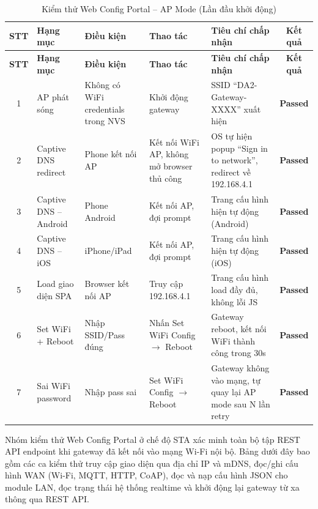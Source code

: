         \begin{longtable}{|c|p{2cm}|p{3cm}|p{3cm}|p{4cm}|c|}
            \caption{Kiểm thử Web Config Portal -- AP Mode (Lần đầu khởi động)}
            \label{tab:test_web_config_ap} \\
            \hline
            \textbf{STT} & \textbf{Hạng mục} & \textbf{Điều kiện} & \textbf{Thao tác} & \textbf{Tiêu chí chấp nhận} & \textbf{Kết quả} \\ \hline
            \endfirsthead
            \hline
            \textbf{STT} & \textbf{Hạng mục} & \textbf{Điều kiện} & \textbf{Thao tác} & \textbf{Tiêu chí chấp nhận} & \textbf{Kết quả} \\ \hline
            \endhead
            \hline
            \endfoot
            \endlastfoot

            1 & AP phát sóng & Không có WiFi credentials trong NVS & Khởi động gateway & SSID ``DA2-Gateway-XXXX'' xuất hiện & \textcolor{modern_blue}{\textbf{Passed}} \\ \hline
            2 & Captive DNS redirect & Phone kết nối AP & Kết nối WiFi AP, không mở browser thủ công & OS tự hiện popup ``Sign in to network'', redirect về 192.168.4.1 & \textcolor{modern_blue}{\textbf{Passed}} \\ \hline
            3 & Captive DNS -- Android & Phone Android & Kết nối AP, đợi prompt & Trang cấu hình hiện tự động (Android) & \textcolor{modern_blue}{\textbf{Passed}} \\ \hline
            4 & Captive DNS -- iOS & iPhone/iPad & Kết nối AP, đợi prompt & Trang cấu hình hiện tự động (iOS) & \textcolor{modern_blue}{\textbf{Passed}} \\ \hline
            5 & Load giao diện SPA & Browser kết nối AP & Truy cập 192.168.4.1 & Trang cấu hình load đầy đủ, không lỗi JS & \textcolor{modern_blue}{\textbf{Passed}} \\ \hline
            6 & Set WiFi + Reboot & Nhập SSID/Pass đúng & Nhấn Set WiFi Config $\rightarrow$ Reboot & Gateway reboot, kết nối WiFi thành công trong 30s & \textcolor{modern_blue}{\textbf{Passed}} \\ \hline
            7 & Sai WiFi password & Nhập pass sai & Set WiFi Config $\rightarrow$ Reboot & Gateway không vào mạng, tự quay lại AP mode sau N lần retry & \textcolor{modern_blue}{\textbf{Passed}} \\ \hline
        \end{longtable}

        Nhóm kiểm thử Web Config Portal ở chế độ STA xác minh toàn bộ tập REST API endpoint khi gateway đã kết nối vào mạng Wi-Fi nội bộ. Bảng dưới đây bao gồm các ca kiểm thử truy cập giao diện qua địa chỉ IP và mDNS, đọc/ghi cấu hình WAN (Wi-Fi, MQTT, HTTP, CoAP), đọc và nạp cấu hình JSON cho module LAN, đọc trạng thái hệ thống realtime và khởi động lại gateway từ xa thông qua REST API.

